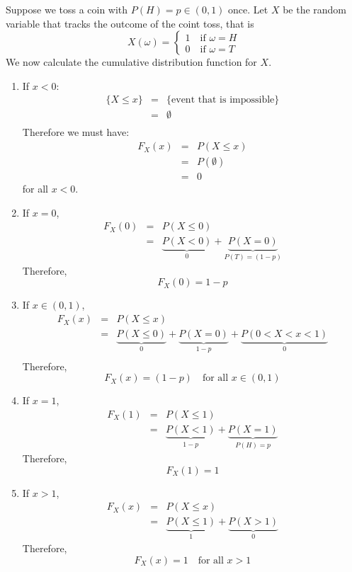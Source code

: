 \begin{ex}
    Suppose we toss a coin with $P(H) = p \in (0,1)$ once. Let $X$ be the random variable that tracks the outcome of the coint toss, that is 
    $$X(\omega) = \begin{cases}
        1 \quad \text{if $\omega = H$}\\
        0 \quad \text{if $\omega = T$}
    \end{cases}$$
    We now calculate the cumulative distribution function for $X$. 

    \begin{enumerate}
        \item If $x < 0$:
\begin{eqnarray*}
\{X \leq x\} &=& \{\text{event that is impossible}\} \\
&=& \emptyset \\
\end{eqnarray*}
Therefore we must have:
\begin{eqnarray*}
    F_X(x) &=& P(X \leq x)\\
    &=& P(\emptyset) \\
    &=& 0
\end{eqnarray*}
for all $x <0$. 
\item If $x = 0$, 
\begin{eqnarray*}
    F_X(0) &=&  P(X \leq 0) \\
&=& \underbrace{P(X < 0)}_{0} + \underbrace{P(X = 0)}_{P(T)=(1-p)} 
\end{eqnarray*}
Therefore,
$$F_X(0) = 1-p$$
\item If $x \in (0,1)$,
\begin{eqnarray*}
    F_X(x) &=& P(X \leq x) \\
&=& \underbrace{P(X \leq 0)}_{0} + \underbrace{P(X=0)}_{1-p} + \underbrace{P(0<X<x<1)}_{0} \\
\end{eqnarray*}
Therefore, 
$$F_X(x) = (1-p) \quad \text{for all } x \in (0,1)$$
\item If $x=1$, 
\begin{eqnarray*}
    F_X(1) &=&  P(X \leq 1) \\
&=& \underbrace{P(X < 1)}_{1-p} + \underbrace{P(X = 1)}_{P(H)=p} 
\end{eqnarray*}
Therefore, 
$$F_X(1) = 1 $$
\item If $x>1$, 
\begin{eqnarray*}
    F_X(x) &=&  P(X \leq x) \\
&=& \underbrace{P(X \le 1)}_{1} + \underbrace{P(X > 1)}_{0} 
\end{eqnarray*}
Therefore, 
$$F_X(x) = 1 \quad \text{for all } x > 1 $$


\end{enumerate}
\end{ex}
